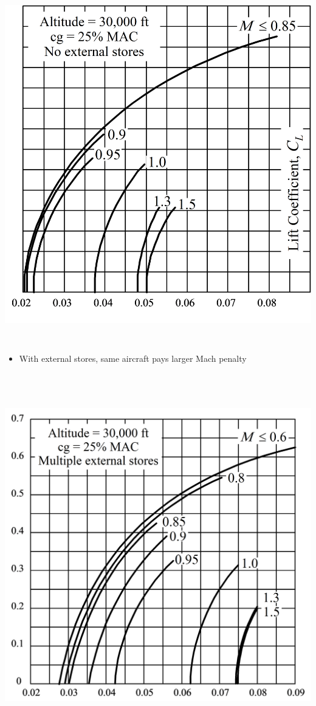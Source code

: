 \documentclass[
]{book}
\providecommand{\tightlist}{%
  \setlength{\itemsep}{0pt}\setlength{\parskip}{0pt}}
\begin{document}
\includegraphics[width=5.851in,height=6.075in]{media/05/image83.svg}

\begin{itemize}
\tightlist
\item
  With external stores, same aircraft pays larger Mach penalty
\end{itemize}

\includegraphics[width=6.528in,height=6.229in]{media/05/image84.svg}
\end{document}
